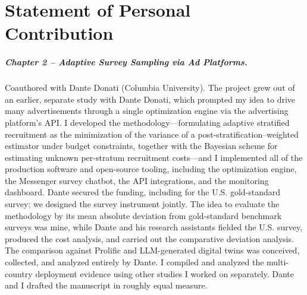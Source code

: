 \chapter*{Statement of Personal Contribution}
\label{coauthor-statements}

\paragraph{Chapter 2 -- Adaptive Survey Sampling via Ad Platforms.}
Coauthored with Dante Donati (Columbia University).
The project grew out of an earlier,
separate study with Dante Donati, which prompted my idea to drive many
advertisements through a single optimization engine via the advertising
platform's API. I developed the methodology---formulating adaptive stratified
recruitment as the minimization of the variance of a post-stratification--weighted
estimator under budget constraints, together with the Bayesian scheme for
estimating unknown per-stratum recruitment costs---and I implemented all of the
production software and open-source tooling, including the optimization engine,
the Messenger survey chatbot, the API integrations, and the monitoring dashboard.
Dante secured the funding, including for the U.S. gold-standard survey; we
designed the survey instrument jointly. The idea to evaluate the methodology by
its mean absolute deviation from gold-standard benchmark surveys was mine, while
Dante and his research assistants fielded the U.S. survey, produced the cost
analysis, and carried out the comparative deviation analysis. The comparison
against Prolific and LLM-generated digital twins was conceived, collected, and
analyzed entirely by Dante. I compiled and analyzed the multi-country deployment
evidence using other studies I worked on separately. Dante and I drafted the manuscript in
roughly equal measure.

